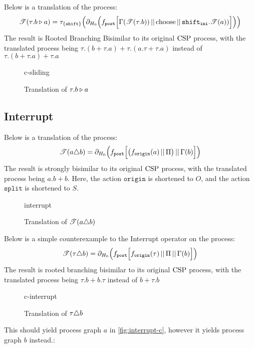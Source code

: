\documentclass[../hons_project.tex]{subfiles}
\begin{document}
Below is a translation of the process:
\[\mathscr{T}(\tau.b \triangleright a)= \tau_{\{\mathtt{shift}\}}\Bigl(\partial_{H_{0}}\Bigl(f_{\mathtt{post}}\Bigl[ \Gamma(\mathscr{T}(\tau.b)) \,\vert\vert\, \mathrm{choose} \,\vert\vert\, \mathtt{shift}_{\mathtt{ini}} . \mathscr{T}(a)) \Bigr]\Bigr)\Bigr)\]
The result is Rooted Branching Bisimilar to its original $\mathrm{CSP}$ process, with the translated process being $\tau.(b+\tau.a) + \tau.(a.\tau+\tau.a)$ instead of $\tau.(b+\tau.a) + \tau.a$

\begin{figure}[H]
	{c-sliding}
	\caption{Translation of $\tau.b \triangleright a$}
\end{figure}


\subsection{Interrupt}
Below is a translation of the process:
\[\mathscr{T}(a \triangle b) = \partial_{H_{0}}\Bigl(f_{\mathtt{post}}\Bigl[ \bigl(f_{\mathtt{origin}}(a) \,\vert\vert\, \Pi\bigr) \,\vert\vert\, \Gamma(b) \Bigr]\Bigr)\]
The result is strongly bisimilar to its original $\mathrm{CSP}$ process, with the translated process being $a.b + b$. Here, the action $\mathtt{origin}$ is shortened to $O$, and the action $\mathtt{split}$ is shortened to $S$.

\begin{figure}[H]
	{interrupt}
	\caption{Translation of $\mathscr{T}(a \triangle b)$}\end{figure}

Below is a simple counterexample to the Interrupt operator on the process:
\[\mathscr{T}(\tau \triangle b) = \partial_{H_{0}}\Bigl(f_{\mathtt{post}}\Bigl[ f_{\mathtt{origin}}(\tau) \,\vert\vert\, \Pi \,\vert\vert\, \Gamma(b) \Bigr]\Bigr)\]
The result is rooted branching bisimilar to its original $\mathrm{CSP}$ process, with the translated process being $\tau.b + b.\tau$ instead of $b + \tau.b$
\begin{figure}[H]
	\centering
	{c-interrupt}
	\caption{Translation of $\tau \triangle b$}
\end{figure}

\newpage
This should yield process graph $a$ in \cref{fig:interrupt-c}, however it yields process graph $b$ instead.:
\begin{multicols}{2}

\end{multicols}
\end{document}
